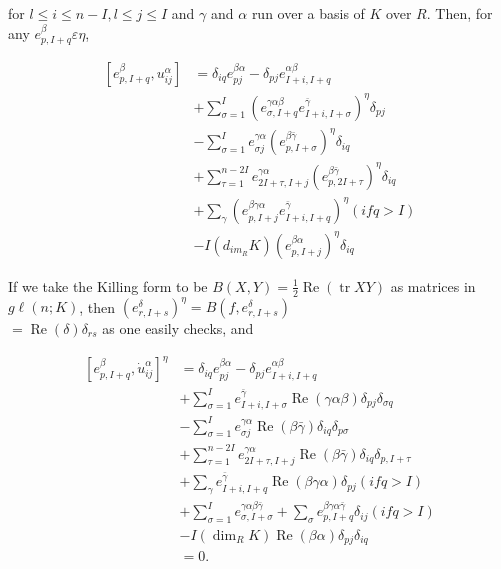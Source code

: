 \documentclass[10pt]{article}
\begin{document}
for $l \leq i \leq n-I, l \leq j \leq I$ and $\gamma$ and $\alpha$ run over a basis of $K$ over $R$. Then, for any $e_{p, I+q}^{\beta} \varepsilon \eta$,

$$
\begin{aligned}
{\left[e_{p, I+q}^{\beta}, u_{i j}^{\alpha}\right] } & =\delta_{i q} e_{p j}^{\beta \alpha}-\delta_{p j} e_{I+i, I+q}^{\alpha \beta} \\
& +\sum_{\sigma=1}^{I}\left(e_{\sigma, I+q}^{\gamma \alpha \beta} e_{I+i, I+\sigma}^{\bar{\gamma}}\right)^{\eta} \delta_{p j} \\
& -\sum_{\sigma=1}^{I} e_{\sigma j}^{\gamma \alpha}\left(e_{p, I+\sigma}^{\beta \bar{\gamma}}\right)^{\eta} \delta_{i q} \\
& +\sum_{\tau=1}^{n-2 I} e_{2 I+\tau, I+j}^{\gamma \alpha}\left(e_{p, 2 I+\tau}^{\beta \bar{\gamma}}\right)^{\eta} \delta_{i q} \\
& +\sum_{\gamma}\left(e_{p, I+j}^{\beta \gamma \alpha} e_{I+i, I+q}^{\bar{\gamma}}\right)^{\eta}(i f q>I) \\
& -I\left(d_{i m_{R}} K\right)\left(e_{p, I+j}^{\beta \alpha}\right)^{\eta} \delta_{i q}
\end{aligned}
$$

If we take the Killing form to be $B(X, Y)=\frac{1}{2} \operatorname{Re}(\operatorname{tr} X Y)$ as matrices in $g \ell(n ; K)$, then $\left(e_{r, I+s}^{\delta}\right)^{\eta}=B\left(f, e_{r, I+s}^{\delta}\right)$\\
$=\operatorname{Re}(\delta) \delta_{r s}$ as one easily checks, and

$$
\begin{aligned}
{\left[e_{p, I+q}^{\beta}, \dot{u}_{i j}^{\alpha}\right]^{\eta} } & =\delta_{i q} e_{p j}^{\beta \alpha}-\delta_{p j} e_{I+i, I+q}^{\alpha \beta} \\
& +\sum_{\sigma=1}^{I} e_{I+i, I+\sigma}^{\bar{\gamma}} \operatorname{Re}(\gamma \alpha \beta) \delta_{p j} \delta_{\sigma q} \\
& -\sum_{\sigma=1}^{I} e_{\sigma j}^{\gamma \alpha} \operatorname{Re}(\beta \bar{\gamma}) \delta_{i q} \delta_{p \sigma} \\
& +\sum_{\tau=1}^{n-2 I} e_{2 I+\tau, I+j}^{\gamma \alpha} \operatorname{Re}(\beta \bar{\gamma}) \delta_{i q} \delta_{p, I+\tau} \\
& +\sum_{\gamma} e_{I+i, I+q}^{\bar{\gamma}} \operatorname{Re}(\beta \gamma \alpha) \delta_{p j}(i f q>I) \\
& +\sum_{\sigma=1}^{I} e_{\sigma, I+\sigma}^{\gamma \alpha \beta \bar{\gamma}}+\sum_{\sigma} e_{p, I+q}^{\beta \gamma \alpha \bar{\gamma}} \delta_{i j}(i f q>I) \\
& -I\left(\operatorname{dim}_{R} K\right) \operatorname{Re}(\beta \alpha) \delta_{p j} \delta_{i q} \\
& =0 .
\end{aligned}
$$
\end{document}
